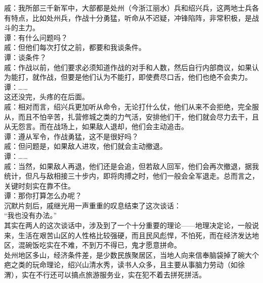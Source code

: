 \begin{multicols}{\theparacolNo}
戚：我所部三千新军中，大部都是处州（今浙江丽水）兵和绍兴兵，这两地士兵各有特点，比如处州兵，作战十分勇猛，听命从不迟疑，冲锋陷阵，非常积极，是战斗的主力。\\

谭：有什么问题吗？\\

戚：但他们每次打仗之前，都要和我谈条件。\\

谭：谈条件？\\

戚：作战以前，他们要求必须知道作战的对手和人数，然后自行内部商议，如果认为能打，就作战，但要是他们认为不能打，即使费尽口舌，他们也绝不会卖力。\\

谭：……\\

这还没完，头疼的在后面。\\

戚：相对而言，绍兴兵更加听从命令，无论打什么仗，他们从来不会拒绝，完全服从，而且不怕辛苦，扎营修城之类的力气活，安排他们干，他们就会尽力去干，且从无怨言。而在战场上，如果敌人退却，他们会主动追击。\\

谭：遵从军令，作战勇猛，这不是很好吗？\\

戚：但问题是，如果敌人进攻，他们就会主动撤退。\\

谭：……\\

戚：当然，如果敌人再退，他们还是会追，但若敌人回军，他们会再次撤退，据我统计，但凡与敌相接三十步内，即将肉搏之时，他们一般会全军退走。总而言之，关键时刻实在靠不住。\\

谭：那你打算怎么办呢？\\

沉默片刻后，戚继光用一声重重的叹息结束了这次谈话：\\

“我也没有办法。”\\

其实在两人的这次谈话中，涉及到了一个十分重要的理论——地理决定论，一般说来，生活在艰苦山区的人性格比较强硬，而且民风彪悍，不怕死，而在经济发达地区，混碗饭吃实在不难，不到万不得已，鬼才愿意拼命。\\

处州地区多山，经济条件差，是少数民族聚居区，当地人向来信奉脑袋掉了碗大个疤之类的玩命理论，绍兴山清水秀，读书人众多，且主要从事脑力劳动（如徐渭），实在不行还可以搞点旅游服务业，实在犯不着去拼死拼活。\\


\end{multicols}

